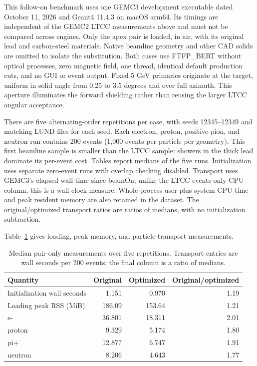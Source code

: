 This follow-on benchmark uses one GEMC3 development executable dated October 11, 2026 and Geant4 11.4.3 on
macOS arm64. Its timings are independent of the GEMC2 LTCC measurements above and must not be compared
across engines. Only the apex pair is loaded, in air, with its original lead and carbon-steel materials.
Native beamline geometry and other CAD solids are omitted to isolate the substitution. Both cases use
FTFP\_BERT without optical processes, zero magnetic field, one thread, identical default production cuts,
and no GUI or event output. Fixed 5 GeV primaries originate at the target, uniform in solid angle from 0.25
to 3.5 degrees and over full azimuth. This aperture illuminates the forward shielding rather than reusing
the larger LTCC angular acceptance.

There are five alternating-order repetitions per case, with seeds 12345--12349 and matching LUND files for
each seed. Each electron, proton, positive-pion, and neutron run contains 200 events (1,000 events per
particle per geometry). This first beamline sample is smaller than the LTCC sample: showers in the thick
lead dominate its per-event cost. Tables report medians of the five runs. Initialization uses separate
zero-event runs with overlap checking disabled. Transport uses GEMC3's elapsed wall time since beamOn;
unlike the LTCC events-only CPU column, this is a wall-clock measure. Whole-process user plus system CPU
time and peak resident memory are also retained in the dataset. The original/optimized transport ratios are
ratios of medians, with no initialization subtraction.

Table~\ref{tab:apex-timing} gives loading, peak memory, and particle-transport measurements.

\begin{table}[htbp]
\centering
\caption{Median pair-only measurements over five repetitions. Transport entries are wall seconds
per 200 events; the final column is a ratio of medians.}
\label{tab:apex-timing}
\begin{tabular}{lrrr}
\toprule
Quantity & Original & Optimized & Original/optimized \\
\midrule
Initialization wall seconds & 1.151 & 0.970 & 1.19 \\
Loading peak RSS (MiB) & 186.09 & 153.64 & 1.21 \\
e- & 36.801 & 18.311 & 2.01 \\
proton & 9.329 & 5.174 & 1.80 \\
pi+ & 12.877 & 6.747 & 1.91 \\
neutron & 8.206 & 4.643 & 1.77 \\
\bottomrule
\end{tabular}
\end{table}

